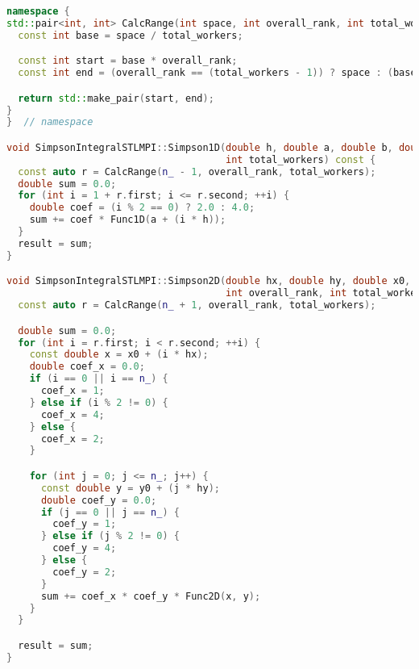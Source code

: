 \documentclass[12pt]{article}
\begin{document}
\begin{lstlisting}[language=C++]
namespace {
std::pair<int, int> CalcRange(int space, int overall_rank, int total_workers) {
  const int base = space / total_workers;

  const int start = base * overall_rank;
  const int end = (overall_rank == (total_workers - 1)) ? space : (base * (overall_rank + 1));

  return std::make_pair(start, end);
}
}  // namespace

void SimpsonIntegralSTLMPI::Simpson1D(double h, double a, double b, double& result, int overall_rank,
                                      int total_workers) const {
  const auto r = CalcRange(n_ - 1, overall_rank, total_workers);
  double sum = 0.0;
  for (int i = 1 + r.first; i <= r.second; ++i) {
    double coef = (i % 2 == 0) ? 2.0 : 4.0;
    sum += coef * Func1D(a + (i * h));
  }
  result = sum;
}

void SimpsonIntegralSTLMPI::Simpson2D(double hx, double hy, double x0, double x1, double y0, double y1, double& result,
                                      int overall_rank, int total_workers) const {
  const auto r = CalcRange(n_ + 1, overall_rank, total_workers);

  double sum = 0.0;
  for (int i = r.first; i < r.second; ++i) {
    const double x = x0 + (i * hx);
    double coef_x = 0.0;
    if (i == 0 || i == n_) {
      coef_x = 1;
    } else if (i % 2 != 0) {
      coef_x = 4;
    } else {
      coef_x = 2;
    }

    for (int j = 0; j <= n_; j++) {
      const double y = y0 + (j * hy);
      double coef_y = 0.0;
      if (j == 0 || j == n_) {
        coef_y = 1;
      } else if (j % 2 != 0) {
        coef_y = 4;
      } else {
        coef_y = 2;
      }
      sum += coef_x * coef_y * Func2D(x, y);
    }
  }

  result = sum;
}
\end{lstlisting}
\end{document}
